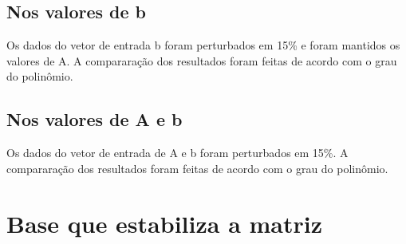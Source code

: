 \section{Nos valores de b}
Os dados do vetor de entrada b foram perturbados em 15\% e foram mantidos os
valores de A.
A compararação dos resultados foram feitas de acordo com o grau do polinômio. 
\section{Nos valores de A e b}

Os dados do vetor de entrada de A e b foram perturbados em 15\%.
A compararação dos resultados foram feitas de acordo com o grau do polinômio.

\chapter{Base que estabiliza a matriz}


